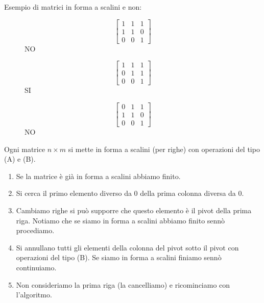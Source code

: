 \begin{example}
Esempio di matrici in forma a scalini e non:
\vspace{-10pt}
\begin{figure}[h!]
    \centering
    \begin{minipage}{.3\linewidth}
        \centering
        \[
            \begin{bmatrix}
            1 & 1 & 1\\
            1 & 1 & 0\\
            0 & 0 & 1
            \end{bmatrix}
        \]
        NO
    \end{minipage}
    \begin{minipage}{.3\linewidth}
        \centering
        \[
            \begin{bmatrix}
            1 & 1 & 1\\
            0 & 1 & 1\\
            0 & 0 & 1
            \end{bmatrix}
        \]
        SI
    \end{minipage}
    \begin{minipage}{.3\linewidth}
        \centering
        \[
            \begin{bmatrix}
            0 & 1 & 1\\
            1 & 1 & 0\\
            0 & 0 & 1
            \end{bmatrix}
        \]
        NO
     \end{minipage}
\end{figure}
\end{example}

\begin{definition}
Ogni matrice $n \times m$ si mette in forma a scalini (per righe) con operazioni del tipo (A) e (B).
\begin{enumerate}
    \item Se la matrice è già in forma a scalini abbiamo finito.
    \item Si cerca il primo elemento diverso da 0 della prima colonna diversa da 0.
    \item Cambiamo righe si può supporre che questo elemento è il pivot della prima riga. Notiamo che se siamo in forma a scalini abbiamo finito sennò procediamo.
    \item Si annullano tutti gli elementi della colonna del pivot sotto il pivot  con operazioni del tipo (B). Se siamo in forma a scalini finiamo sennò continuiamo.
    \item Non consideriamo la prima riga (la cancelliamo) e ricominciamo con l'algoritmo.
\end{enumerate}
\end{definition}

